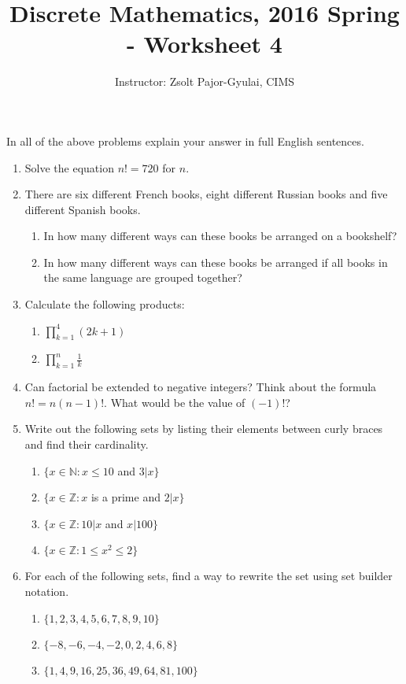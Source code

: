 \documentclass[11pt]{preprint}
\title{Discrete Mathematics, 2016 Spring - Worksheet 4}
\author{Instructor: Zsolt Pajor-Gyulai, CIMS}
\begin{document}
\maketitle

In all of the above problems explain your answer in full English sentences.

\begin{enumerate}

\item Solve the equation $n!=720$ for $n$.

\item There are six different French books, eight different Russian books and five different Spanish books.

\begin{enumerate}
\item In how many different ways can these books be arranged on a bookshelf?
\item In how many different ways can these books be arranged if all books in the same language are grouped together?
\end{enumerate}


\item Calculate the following products:
\begin{enumerate}
\item $\prod_{k=1}^4(2k+1)$
\item $\prod_{k=1}^n\frac{1}{k}$
\end{enumerate}

\item Can factorial be extended to negative integers? Think about the formula $n!=n(n-1)!$. What would be the value of $(-1)!$?

\item Write out the following sets by listing their elements between curly braces and find their cardinality.
\begin{enumerate}
\item $\{x\in\mathbb{N}: x\leq 10$ and $3|x\}$
\item $\{x\in\mathbb{Z}: x$ is a prime and $2|x\}$ 
\item $\{x\in\mathbb{Z}: 10|x$ and $x|100\}$
\item $\{x\in\mathbb{Z}: 1\leq x^2\leq 2\}$
\end{enumerate}

\item For each of the following sets, find a way to rewrite the set using set builder notation.
\begin{enumerate}
\item $\{1,2,3,4,5,6,7,8,9,10\}$
\item $\{-8,-6,-4,-2,0,2,4,6,8\}$
\item $\{1,4,9,16,25,36,49,64,81,100\}$
\end{enumerate}


\end{enumerate}
\end{document}
